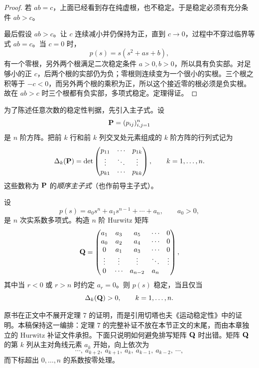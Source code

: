 \begin{proof}
若 \(ab=c\)，上面已经看到存在纯虚根，也不稳定。于是稳定必须有充分条件 \(ab>c\)。

最后假设 \(ab>c\)。让 \(c\) 连续减小并仍保持为正，直到 \(c\to0\)，过程中不穿过临界等式 \(ab=c\)。当 \(c=0\) 时，
\begin{equation}
 p(s)=s(s^2+as+b),
 \label{eq:ch2-9-boundary-cubic}
\end{equation}
有一个零根，另外两个根满足二次稳定条件 \(a>0,b>0\)，所以具有负实部。对足够小的正 \(c\)，后两个根的实部仍为负；零根则连续变为一个很小的实根。三个根之积等于 \(-c<0\)，而另外两个根的乘积为正，所以这个接近零的根必须是负实根。故在 \(ab>c\) 时三个根都有负实部，多项式稳定。定理得证。
\end{proof}

为了陈述任意次数的稳定性判据，先引入主子式。设
\[
 \mathbf{P}=(p_{ij})_{i,j=1}^n
\]
是 \(n\) 阶方阵。把前 \(k\) 行和前 \(k\) 列交叉处元素组成的 \(k\) 阶方阵的行列式记为
\[
 \Delta_k(\mathbf{P})=
 \det
 \begin{pmatrix}
  p_{11}&\cdots&p_{1k}\\
  \vdots&\ddots&\vdots\\
  p_{k1}&\cdots&p_{kk}
 \end{pmatrix},
 \qquad k=1,\ldots,n.
\]
这些数称为 \(\mathbf{P}\) 的\emph{顺序主子式}（也作前导主子式）。

\begin{theorem}
\label{thm:ch2-7-hurwitz}
 设
 \begin{equation}
  p(s)=a_0s^n+a_1s^{n-1}+\cdots+a_n,
  \qquad a_0>0,
  \label{eq:ch2-9-hurwitz-polynomial}
 \end{equation}
 是 \(n\) 次实系数多项式。构造 \(n\) 阶 Hurwitz 矩阵
 \begin{equation}
  \mathbf{Q}=
  \begin{pmatrix}
   a_1&a_3&a_5&\cdots&0\\
   a_0&a_2&a_4&\cdots&0\\
   0&a_1&a_3&\cdots&0\\
   \vdots&\vdots&\vdots&\ddots&\vdots\\
   0&\cdots&a_{n-2}&a_n
  \end{pmatrix},
  \label{eq:ch2-9-hurwitz-matrix}
 \end{equation}
 其中当 \(r<0\) 或 \(r>n\) 时约定 \(a_r=0\)。则 \(p(s)\) 稳定，当且仅当
 \[
  \Delta_k(\mathbf{Q})>0,
  \qquad k=1,\ldots,n.
 \]
\end{theorem}

原书在正文中不展开定理 7 的证明，而是引用切塔也夫《运动稳定性》中的证明。本稿保持这一编排：定理 7 的完整补证不放在本节正文的末尾，而由本章独立的 Hurwitz 补证文件承担。下面只说明如何避免排写矩阵 \(\mathbf{Q}\) 时出错。矩阵 \(\mathbf{Q}\) 的第 \(k\) 列从主对角线元素 \(a_k\) 开始，向上依次为
\[
 \cdots,\ a_{k+2},\ a_{k+1},\ a_k,\ a_{k-1},\ a_{k-2},\ \cdots,
\]
而下标超出 \(0,\ldots,n\) 的系数按零处理。

